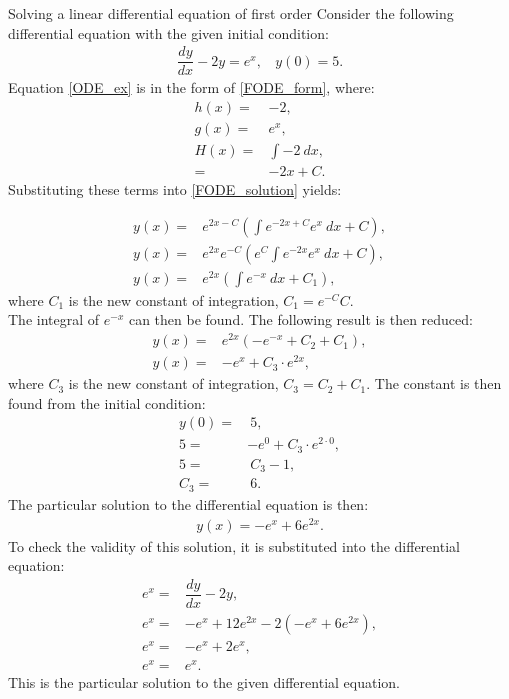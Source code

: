 \begin{example}{Solving a linear differential equation of first order}{}
Consider the following differential equation with the given initial condition:
\begin{align}
	\dfrac{dy}{dx}-2y = e^x, \label{ODE_ex} ~~~~y(0) = 5.
\end{align}
Equation \eqref{ODE_ex} is in the form of \eqref{FODE_form}, where:
\begin{align*}
	h(x) =& -2, \\
	g(x) =& e^x, \\
	H(x) =& \int{-2 \ dx}, \\
	     =& -2x + C.
\end{align*}
Substituting these terms into \eqref{FODE_solution} yields: 

\begin{align*}
	y(x)=&e^{2x-C}\left(\int{e^{-2x+C}e^x\ dx}+C\right), \\
	y(x)=&e^{2x}e^{-C}\left(e^{C}\int{e^{-2x}e^{x}\ dx}+C\right), \\
	y(x)=&e^{2x}\left(\int{e^{-x}\ dx}+C_{1}\right),
\end{align*}
where $C_{1}$ is the new constant of integration, $C_1=e^{-C}C$. \\
The integral of $e^{-x}$ can then be found. The following result is then reduced:
\begin{align*}
	y(x)=&e^{2x}\left(-e^{-x}+C_{2}+C_{1}\right), \\
	y(x)=&-e^x+C_{3} \cdot e^{2x},
\end{align*}
where $C_{3}$ is the new constant of integration, $C_{3}=C_{2}+C_{1}$. The constant is then found from the initial condition:
\begin{align*}
	y(0)=& ~ 5, \\
	5=&-e^0+C_{3} \cdot e^{2 \cdot 0}, \\
	5 =& ~ C_{3}-1, \\
	C_{3} =& ~ 6.
\end{align*}
The particular solution to the differential equation is then:
\begin{align*}
	y(x) = -e^x+6e^{2x}.
\end{align*}
To check the validity of this solution, it is substituted into the differential equation:
\begin{align*}
	e^x =& \dfrac{dy}{dx} -2y, \\
	e^x =& -e^x+12e^{2x} -2\left(-e^x+6e^{2x}\right),  \\
	e^x =& -e^x+2e^x,  \\
	e^x =& e^x.
\end{align*}
This is the particular solution to the given differential equation.
\end{example}

